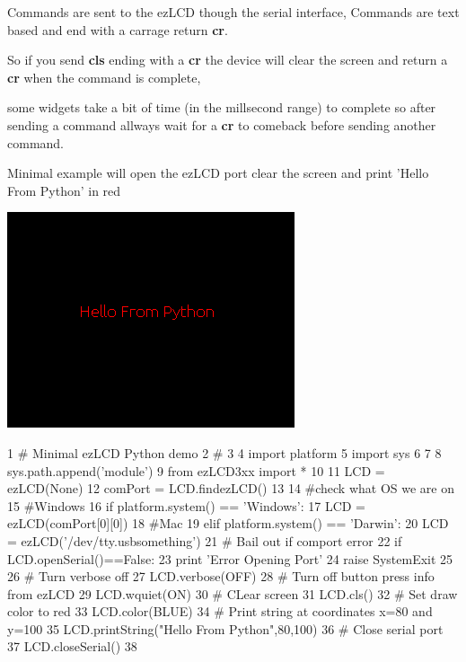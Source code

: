 Commands are sent to the ez\-L\-C\-D though the serial interface, Commands are text based and end with a carrage return {\bfseries cr}.\par
 So if you send {\bfseries cls} ending with a {\bfseries cr} the device will clear the screen and return a {\bfseries cr} when the command is complete,\par
 some widgets take a bit of time (in the millsecond range) to complete so after sending a command allways wait for a {\bfseries cr} to comeback before sending another command.\par
 

\par
 Minimal example will open the ez\-L\-C\-D port clear the screen and print 'Hello From Python' in red \par
  
\begin{DoxyImageNoCaption}
  \mbox{\includegraphics{minimal.png}}
\end{DoxyImageNoCaption}
 
\begin{DoxyCodeInclude}
1 \textcolor{comment}{# Minimal ezLCD Python demo}
2 \textcolor{comment}{#}
3 
4 \textcolor{keyword}{import} platform
5 \textcolor{keyword}{import} sys
6 
7 
8 sys.path.append(\textcolor{stringliteral}{'module'}) 
9 \textcolor{keyword}{from} ezLCD3xx \textcolor{keyword}{import} *
10 
11 LCD = ezLCD(\textcolor{keywordtype}{None}) 
12 comPort =  LCD.findezLCD()
13 
14 \textcolor{comment}{#check what OS we are on}
15 \textcolor{comment}{#Windows}
16 \textcolor{keywordflow}{if} platform.system() == \textcolor{stringliteral}{'Windows'}:
17     LCD = ezLCD(comPort[0][0])
18 \textcolor{comment}{#Mac}
19 \textcolor{keywordflow}{elif} platform.system() == \textcolor{stringliteral}{'Darwin'}:
20     LCD = ezLCD(\textcolor{stringliteral}{'/dev/tty.usbsomething'})
21 \textcolor{comment}{# Bail out if comport error}
22 \textcolor{keywordflow}{if} LCD.openSerial()==\textcolor{keyword}{False}:
23     \textcolor{keywordflow}{print} \textcolor{stringliteral}{'Error Opening Port'}
24     \textcolor{keywordflow}{raise} SystemExit
25 
26 \textcolor{comment}{# Turn verbose off }
27 LCD.verbose(OFF)
28 \textcolor{comment}{# Turn off button press info from ezLCD}
29 LCD.wquiet(ON)
30 \textcolor{comment}{# CLear screen}
31 LCD.cls()
32 \textcolor{comment}{# Set draw color to red}
33 LCD.color(BLUE)
34 \textcolor{comment}{# Print string at coordinates x=80 and y=100}
35 LCD.printString(\textcolor{stringliteral}{"Hello From Python"},80,100)
36 \textcolor{comment}{# Close serial port}
37 LCD.closeSerial()
38 
\end{DoxyCodeInclude}
 